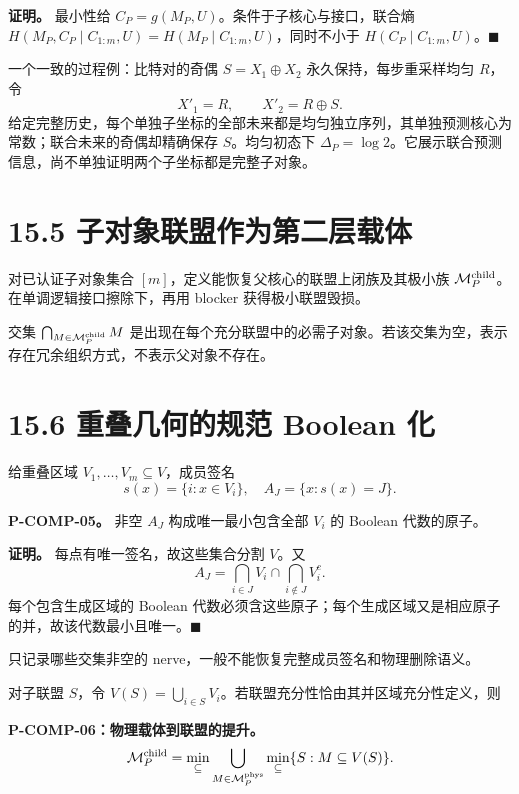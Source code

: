 \documentclass[
  11pt,
  oneside]{book}
\begin{document}
\textbf{证明。} 最小性给 \(C_P=g(M_P,U)\)。条件于子核心与接口，联合熵 \(H(M_P,C_P\mid C_{1:m},U)=H(M_P\mid C_{1:m},U)\)，同时不小于 \(H(C_P\mid C_{1:m},U)\)。\(\blacksquare\)

一个一致的过程例：比特对的奇偶 \(S=X_1\oplus X_2\) 永久保持，每步重采样均匀 \(R\)，令 \[X'_1=R,\qquad X'_2=R\oplus S.\] 给定完整历史，每个单独子坐标的全部未来都是均匀独立序列，其单独预测核心为常数；联合未来的奇偶却精确保存 \(S\)。均匀初态下 \(\Delta_P=\log2\)。它展示联合预测信息，尚不单独证明两个子坐标都是完整子对象。

\section{15.5 子对象联盟作为第二层载体}\label{ux5b50ux5bf9ux8c61ux8054ux76dfux4f5cux4e3aux7b2cux4e8cux5c42ux8f7dux4f53}

对已认证子对象集合 \([m]\)，定义能恢复父核心的联盟上闭族及其极小族 \(\mathcal M_P^{\rm child}\)。在单调逻辑接口擦除下，再用 blocker 获得极小联盟毁损。

交集 \(\bigcap_{M\in\mathcal M_P^{\rm child}}M\) 是出现在每个充分联盟中的必需子对象。若该交集为空，表示存在冗余组织方式，不表示父对象不存在。

\section{15.6 重叠几何的规范 Boolean 化}\label{ux91cdux53e0ux51e0ux4f55ux7684ux89c4ux8303-boolean-ux5316}

给重叠区域 \(V_1,\ldots,V_m\subseteq V\)，成员签名 \[s(x)=\{i:x\in V_i\},\quad A_J=\{x:s(x)=J\}.\]

\hypertarget{p-comp-05}{}\label{p-comp-05}

\textbf{P-COMP-05。} 非空 \(A_J\) 构成唯一最小包含全部 \(V_i\) 的 Boolean 代数的原子。

\textbf{证明。} 每点有唯一签名，故这些集合分割 \(V\)。又 \[A_J=\bigcap_{i\in J}V_i\cap\bigcap_{i\notin J}V_i^c.\] 每个包含生成区域的 Boolean 代数必须含这些原子；每个生成区域又是相应原子的并，故该代数最小且唯一。\(\blacksquare\)

只记录哪些交集非空的 nerve，一般不能恢复完整成员签名和物理删除语义。

对子联盟 \(S\)，令 \(V(S)=\bigcup_{i\in S}V_i\)。若联盟充分性恰由其并区域充分性定义，则

\hypertarget{p-comp-06}{}\label{p-comp-06}

\textbf{P-COMP-06：物理载体到联盟的提升。} \[\mathcal M_P^{\rm child}
=\min_{\subseteq}
\bigcup_{M\in\mathcal M_P^{\rm phys}}
\min_{\subseteq}\{S:M\subseteq V(S)\}.\]
\end{document}
